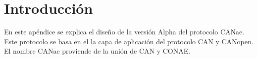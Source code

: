 \section{Introducción}
En este apéndice se explica el diseño de la versión Alpha del protocolo CANae. Este protocolo se basa en el la capa de aplicación del protocolo CAN y CANopen. El nombre CANae proviende de la unión de CAN y CONAE. 
